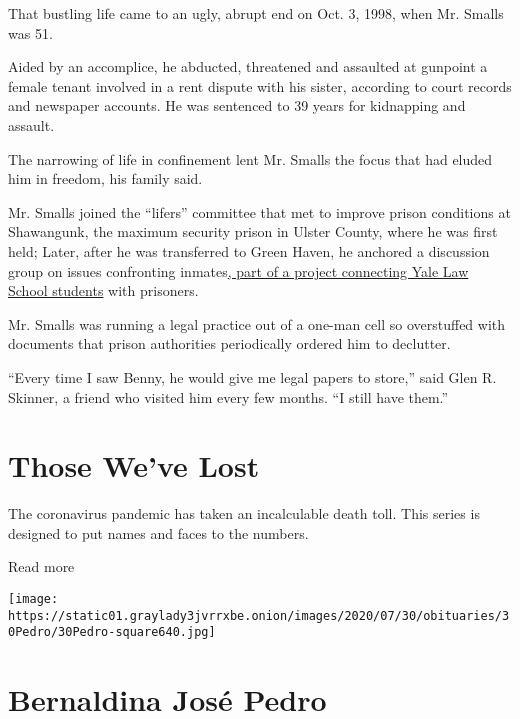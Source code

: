 That bustling life came to an ugly, abrupt end on Oct. 3, 1998, when Mr.
Smalls was 51.

Aided by an accomplice, he abducted, threatened and assaulted at
gunpoint a female tenant involved in a rent dispute with his sister,
according to court records and newspaper accounts. He was sentenced to
39 years for kidnapping and assault.

The narrowing of life in confinement lent Mr. Smalls the focus that had
eluded him in freedom, his family said.

Mr. Smalls joined the ``lifers'' committee that met to improve prison
conditions at Shawangunk, the maximum security prison in Ulster County,
where he was first held; Later, after he was transferred to Green Haven,
he anchored a discussion group on issues confronting
inmates\href{https://law.yale.edu/student-life/student-journals-organizations/student-organizations/green-haven-prison-project}{,
part of a project connecting Yale Law School students} with prisoners.

Mr. Smalls was running a legal practice out of a one-man cell so
overstuffed with documents that prison authorities periodically ordered
him to declutter.

``Every time I saw Benny, he would give me legal papers to store,'' said
Glen R. Skinner, a friend who visited him every few months. ``I still
have them.''

\href{https://www.nytimes3xbfgragh.onion/interactive/2020/obituaries/people-died-coronavirus-obituaries.html?action=click\&pgtype=Article\&state=default\&region=BELOW_MAIN_CONTENT\&context=covid_obits_promo}{}

\hypertarget{those-weve-lost}{%
\section{Those We've Lost}\label{those-weve-lost}}

The coronavirus pandemic has taken an incalculable death toll. This
series is designed to put names and faces to the numbers.

Read more

\texttt{[image: https://static01.graylady3jvrrxbe.onion/images/2020/07/30/obituaries/30Pedro/30Pedro-square640.jpg]}

\hypertarget{bernaldina-josuxe9-pedro}{%
\section{Bernaldina José Pedro}\label{bernaldina-josuxe9-pedro}}

